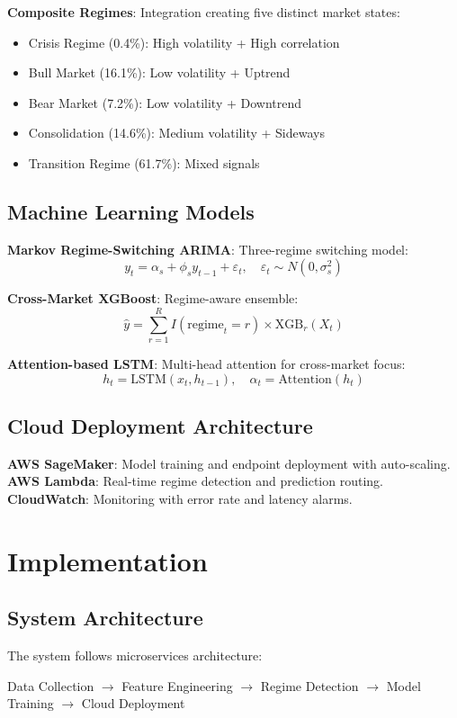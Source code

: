 \documentclass[conference]{IEEEtran}
\begin{document}
\textbf{Composite Regimes}: Integration creating five distinct market states:
\begin{itemize}
    \item Crisis Regime (0.4\%): High volatility + High correlation
    \item Bull Market (16.1\%): Low volatility + Uptrend
    \item Bear Market (7.2\%): Low volatility + Downtrend
    \item Consolidation (14.6\%): Medium volatility + Sideways
    \item Transition Regime (61.7\%): Mixed signals
\end{itemize}

\subsection{Machine Learning Models}

\textbf{Markov Regime-Switching ARIMA}: Three-regime switching model:
\begin{equation}
y_t = \alpha_s + \phi_s y_{t-1} + \varepsilon_t, \quad \varepsilon_t \sim N(0, \sigma^2_s)
\end{equation}

\textbf{Cross-Market XGBoost}: Regime-aware ensemble:
\begin{equation}
\hat{y} = \sum_{r=1}^R I(\text{regime}_t = r) \times \text{XGB}_r(X_t)
\end{equation}

\textbf{Attention-based LSTM}: Multi-head attention for cross-market focus:
\begin{equation}
h_t = \text{LSTM}(x_t, h_{t-1}), \quad \alpha_t = \text{Attention}(h_t)
\end{equation}

\subsection{Cloud Deployment Architecture}
\textbf{AWS SageMaker}: Model training and endpoint deployment with auto-scaling.
\textbf{AWS Lambda}: Real-time regime detection and prediction routing.
\textbf{CloudWatch}: Monitoring with error rate and latency alarms.

\section{Implementation}

\subsection{System Architecture}
The system follows microservices architecture:
\begin{center}
Data Collection $\rightarrow$ Feature Engineering $\rightarrow$ Regime Detection $\rightarrow$ Model Training $\rightarrow$ Cloud Deployment
\end{center}
\end{document}
